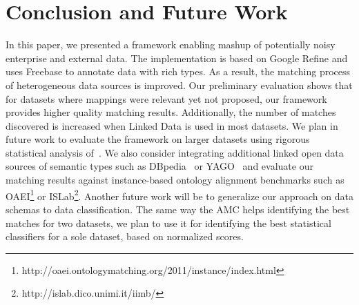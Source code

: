 
\section{Conclusion and Future Work}

In this paper, we presented a framework enabling mashup of potentially noisy enterprise and external data. The implementation is based on Google Refine and uses Freebase to annotate data with rich types. As a result, the matching process of heterogeneous data sources is improved. Our preliminary evaluation shows that for datasets where mappings were relevant yet not proposed, our framework provides higher quality matching results. Additionally, the number of matches discovered is increased when Linked Data is used in most datasets. We plan in future work to evaluate the framework on larger datasets using rigorous statistical analysis of~\cite{Fawcett:PatternRec:06}. We also consider integrating additional linked open data sources of semantic types such as DBpedia~\cite{Bizer:WebSemJorunal:09} or YAGO~\cite{Suchanek::WWW:07} and evaluate our matching results against instance-based ontology alignment benchmarks such as OAEI\footnote{http://oaei.ontologymatching.org/2011/instance/index.html} or ISLab\footnote{http://islab.dico.unimi.it/iimb/}. Another future work will be to generalize our approach on data schemas to data classification. The same way the AMC helps identifying the best matches for two datasets, we plan to use it for identifying the best statistical classifiers for a sole dataset, based on normalized scores.
